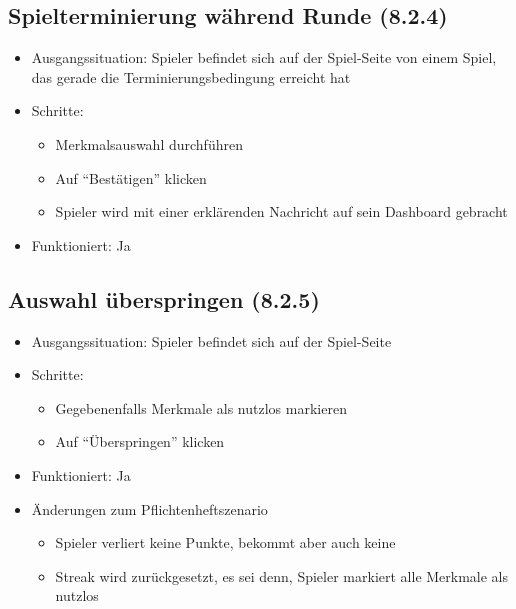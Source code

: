 \documentclass[a4paper]{scrreprt}
\begin{document}
            \subsection{Spielterminierung während Runde (8.2.4)}
            \begin{itemize}
                \item Ausgangssituation: Spieler befindet sich auf der Spiel-Seite von einem Spiel, das gerade die Terminierungsbedingung erreicht hat
                \item Schritte:
                    \begin{itemize}
                        \item Merkmalsauswahl durchführen
                        \item Auf \enquote{Bestätigen} klicken
                        \item Spieler wird mit einer erklärenden Nachricht auf sein Dashboard gebracht
                    \end{itemize}
                \item Funktioniert: Ja
            \end{itemize}

            \subsection{Auswahl überspringen (8.2.5)}
            \begin{itemize}
                \item Ausgangssituation: Spieler befindet sich auf der Spiel-Seite
                \item Schritte:
                    \begin{itemize}
                        \item Gegebenenfalls Merkmale als nutzlos markieren
                        \item Auf \enquote{Überspringen} klicken
                    \end{itemize}
                \item Funktioniert: Ja
                \item Änderungen zum Pflichtenheftszenario
                \begin{itemize}
                    \item Spieler verliert keine Punkte, bekommt aber auch keine
                    \item Streak wird zurückgesetzt, es sei denn, Spieler markiert alle Merkmale als nutzlos
                \end{itemize}
            \end{itemize}
\end{document}
